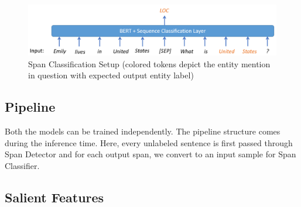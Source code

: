\begin{figure}[h!]
    \centering
    \includegraphics[scale=0.63]{span_classification}
    \caption{Span Classification Setup (colored tokens depict the entity mention in question with expected output entity label)}
    \label{fig:span_classification}
\end{figure}

\subsection{Pipeline}
Both the models can be trained independently. The pipeline structure comes during the inference time. Here, every unlabeled sentence is first passed through Span Detector and for each output span, we convert to an input sample for Span Classifier.

\subsection{Salient Features}

